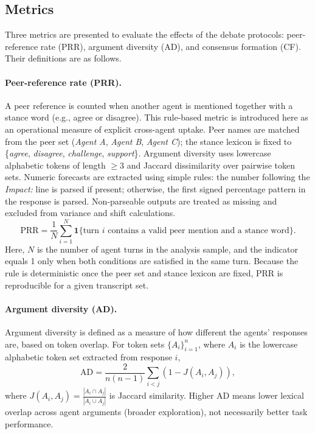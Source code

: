 \documentclass[11pt]{article}
\begin{document}
\subsection{Metrics}
Three metrics are presented to evaluate the effects of the debate protocols: peer-reference rate (PRR), argument diversity (AD), and consensus formation (CF). Their definitions are as follows.

\paragraph{Peer-reference rate (PRR).}
A peer reference is counted when another agent is mentioned together with a stance word (e.g., agree or disagree). This rule-based metric is introduced here as an operational measure of explicit cross-agent uptake. Peer names are matched from the peer set (\emph{Agent A}, \emph{Agent B}, \emph{Agent C}); the stance lexicon is fixed to \{\emph{agree}, \emph{disagree}, \emph{challenge}, \emph{support}\}. Argument diversity uses lowercase alphabetic tokens of length $\ge 3$ and Jaccard dissimilarity over pairwise token sets. Numeric forecasts are extracted using simple rules: the number following the \emph{Impact:} line is parsed if present; otherwise, the first signed percentage pattern in the response is parsed. Non-parseable outputs are treated as missing and excluded from variance and shift calculations.
\begin{equation}
\mathrm{PRR} = \frac{1}{N} \sum_{i=1}^{N} \mathbf{1}\{\text{turn } i \text{ contains a valid peer mention and a stance word}\}.
\end{equation}
Here, $N$ is the number of agent turns in the analysis sample, and the indicator equals 1 only when both conditions are satisfied in the same turn. Because the rule is deterministic once the peer set and stance lexicon are fixed, PRR is reproducible for a given transcript set.

\paragraph{Argument diversity (AD).}
Argument diversity is defined as a measure of how different the agents' responses are, based on token overlap. For token sets $\{A_i\}_{i=1}^{n}$, where $A_i$ is the lowercase alphabetic token set extracted from response $i$,
\begin{equation}
\mathrm{AD} = \frac{2}{n(n-1)}\sum_{i<j}\left(1 - J(A_i,A_j)\right),
\end{equation}
where $J(A_i,A_j)=\frac{|A_i\cap A_j|}{|A_i\cup A_j|}$ is Jaccard similarity.
Higher AD means lower lexical overlap across agent arguments (broader exploration), not necessarily better task performance.
\end{document}
